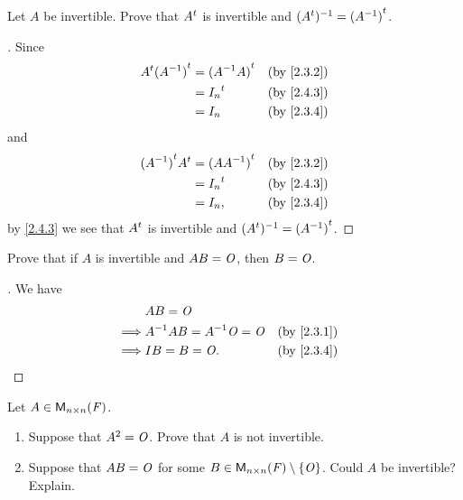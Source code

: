\begin{ex}\label{ex:2.4.5}
  Let \(A\) be invertible.
  Prove that \({A}^{t}\) is invertible and \(({A}^{t})^{-1} = {(A^{-1})}^{t}\).
\end{ex}

\begin{proof}[]
  Since
  \begin{align*}
    \tp{A} \tp{(A^{-1})} & = \tp{(A^{-1} A)} &  & \by{2.3.2} \\
                         & = \tp{I_n}        &  & \by{2.4.3} \\
                         & = I_n             &  & \by{2.3.4}
  \end{align*}
  and
  \begin{align*}
    \tp{(A^{-1})} \tp{A} & = \tp{(A A^{-1})} &  & \by{2.3.2} \\
                         & = \tp{I_n}        &  & \by{2.4.3} \\
                         & = I_n,            &  & \by{2.3.4}
  \end{align*}
  by \cref{2.4.3} we see that \({A}^{t}\) is invertible and \(({A}^{t})^{-1} = {(A^{-1})}^{t}\).
\end{proof}

\begin{ex}\label{ex:2.4.6}
  Prove that if \(A\) is invertible and \(AB = \mathit{O}\), then \(B = \mathit{O}\).
\end{ex}

\begin{proof}[]
  We have
  \begin{align*}
             & AB = \zm                                     \\
    \implies & A^{-1} AB = A^{-1} \zm = \zm &  & \by{2.3.1} \\
    \implies & IB = B = \zm.                &  & \by{2.3.4}
  \end{align*}
\end{proof}

\begin{ex}\label{ex:2.4.7}
  Let \(A \in \ms[n][n][\F]\).
  \begin{enumerate}
    \item Suppose that \(A^2 = \mathit{O}\).
          Prove that \(A\) is not invertible.
    \item Suppose that \(AB = \mathit{O}\) for some \(B \in \ms[n][n][\F] \setminus \set{\zm}\).
          Could \(A\) be invertible?
          Explain.
  \end{enumerate}
\end{ex}

